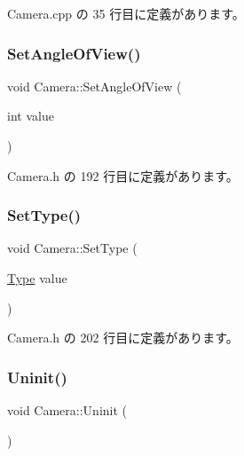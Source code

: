  Camera.\+cpp の 35 行目に定義があります。

\mbox{\label{class_camera_a4c22c8ceed9126db627df9be7eb53a42}} 
\subsubsection{\texorpdfstring{Set\+Angle\+Of\+View()}{SetAngleOfView()}}
{\footnotesize\ttfamily void Camera\+::\+Set\+Angle\+Of\+View (\begin{DoxyParamCaption}\item[{int}]{value }\end{DoxyParamCaption})\hspace{0.3cm}{\ttfamily [inline]}}



 Camera.\+h の 192 行目に定義があります。

\mbox{\label{class_camera_a6218126e761a8289c6e6bc8c66b05e47}} 
\subsubsection{\texorpdfstring{Set\+Type()}{SetType()}}
{\footnotesize\ttfamily void Camera\+::\+Set\+Type (\begin{DoxyParamCaption}\item[{\mbox{\hyperlink{class_camera_a3b0a1f58deca679ac665f61c480d1dcb}{Type}}}]{value }\end{DoxyParamCaption})\hspace{0.3cm}{\ttfamily [inline]}}



 Camera.\+h の 202 行目に定義があります。

\mbox{\label{class_camera_a8b3337b3e560ea6a780d646bc8c509d7}} 
\subsubsection{\texorpdfstring{Uninit()}{Uninit()}}
{\footnotesize\ttfamily void Camera\+::\+Uninit (\begin{DoxyParamCaption}{ }\end{DoxyParamCaption})}



